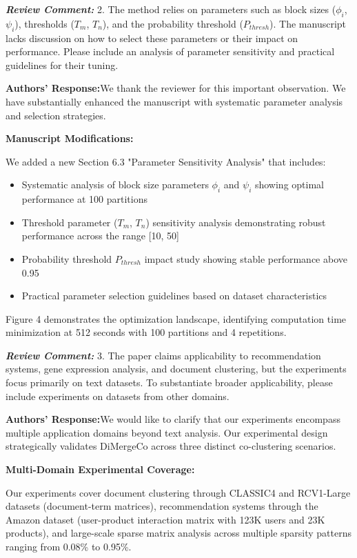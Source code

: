 \documentclass{ar2rc}
\renewcommand{\RC}[1]{\textbf{\textit{Review Comment:}} #1}
\renewcommand{\AR}{\textbf{Authors' Response:}}
\begin{document}
\RC{2. The method relies on parameters such as block sizes ($\phi_i$, $\psi_i$), thresholds ($T_m$, $T_n$), and the probability threshold ($P_{thresh}$). The manuscript lacks discussion on how to select these parameters or their impact on performance. Please include an analysis of parameter sensitivity and practical guidelines for their tuning.}

\AR We thank the reviewer for this important observation. We have substantially enhanced the manuscript with systematic parameter analysis and selection strategies.

\textbf{Manuscript Modifications:}

We added a new Section 6.3 "Parameter Sensitivity Analysis" that includes:

\begin{itemize}
  \item Systematic analysis of block size parameters $\phi_i$ and $\psi_i$ showing optimal performance at 100 partitions
  \item Threshold parameter ($T_m$, $T_n$) sensitivity analysis demonstrating robust performance across the range [10, 50]
  \item Probability threshold $P_{thresh}$ impact study showing stable performance above 0.95
  \item Practical parameter selection guidelines based on dataset characteristics
\end{itemize}

Figure 4 demonstrates the optimization landscape, identifying computation time minimization at 512 seconds with 100 partitions and 4 repetitions.

\RC{3. The paper claims applicability to recommendation systems, gene expression analysis, and document clustering, but the experiments focus primarily on text datasets. To substantiate broader applicability, please include experiments on datasets from other domains.}

\AR We would like to clarify that our experiments encompass multiple application domains beyond text analysis. Our experimental design strategically validates DiMergeCo across three distinct co-clustering scenarios.

\textbf{Multi-Domain Experimental Coverage:}

Our experiments cover document clustering through CLASSIC4 and RCV1-Large datasets (document-term matrices), recommendation systems through the Amazon dataset (user-product interaction matrix with 123K users and 23K products), and large-scale sparse matrix analysis across multiple sparsity patterns ranging from 0.08\% to 0.95\%.
\end{document}
